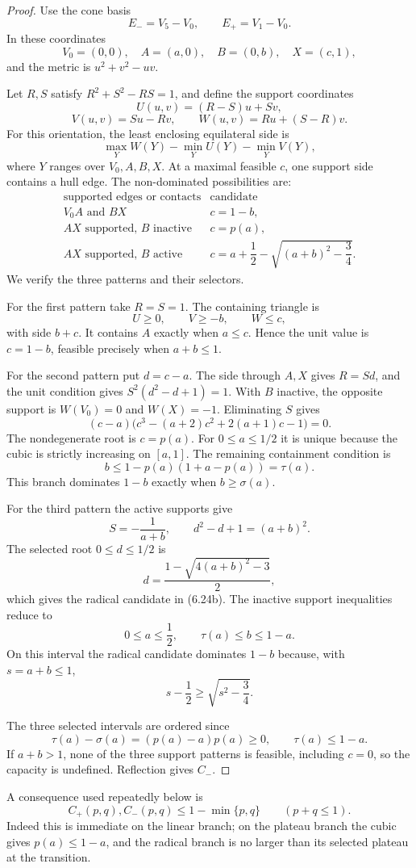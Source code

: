 \begin{proof}
Use the cone basis
\[
 E_-=V_5-V_0,
 \qquad E_+=V_1-V_0.
\]
In these coordinates
\[
 V_0=(0,0),\quad A=(a,0),\quad B=(0,b),\quad X=(c,1),
\]
and the metric is $u^2+v^2-uv$.

Let $R,S$ satisfy $R^2+S^2-RS=1$, and define the support coordinates
\[
 U(u,v)=(R-S)u+Sv,
\]
\[
 V(u,v)=Su-Rv,
 \qquad
 W(u,v)=Ru+(S-R)v.
\]
For this orientation, the least enclosing equilateral side is
\[
 \max_YW(Y)-\min_YU(Y)-\min_YV(Y),
 \tag{6.24c}
\]
where $Y$ ranges over $V_0,A,B,X$.  At a maximal feasible $c$, one support
side contains a hull edge.  The non-dominated possibilities are:
\[
\begin{array}{c|c}
\text{supported edges or contacts}&\text{candidate}\\
\hline
V_0A\text{ and }BX&c=1-b,\\
AX\text{ supported, }B\text{ inactive}&c=p(a),\\
AX\text{ supported, }B\text{ active}
 &c=a+\dfrac12-\sqrt{(a+b)^2-\dfrac34}.
\end{array}
\tag{6.24d}
\]
We verify the three patterns and their selectors.

For the first pattern take $R=S=1$.  The containing triangle is
\[
 U\ge0,
 \qquad V\ge-b,
 \qquad W\le c,
\]
with side $b+c$.  It contains $A$ exactly when $a\le c$.  Hence the unit
value is $c=1-b$, feasible precisely when $a+b\le1$.

For the second pattern put $d=c-a$.  The side through $A,X$ gives $R=Sd$,
and the unit condition gives $S^2(d^2-d+1)=1$.  With $B$ inactive, the
opposite support is $W(V_0)=0$ and $W(X)=-1$.  Eliminating $S$ gives
\[
(c-a)
\bigl(c^3-(a+2)c^2+2(a+1)c-1\bigr)=0.
\]
The nondegenerate root is $c=p(a)$.  For $0\le a\le1/2$ it is unique because
the cubic is strictly increasing on $[a,1]$.  The remaining containment
condition is
\[
 b\le1-p(a)(1+a-p(a))=\tau(a).
\]
This branch dominates $1-b$ exactly when $b\ge\sigma(a)$.

For the third pattern the active supports give
\[
 S=-\frac1{a+b},
 \qquad
 d^2-d+1=(a+b)^2.
\]
The selected root $0\le d\le1/2$ is
\[
 d=\frac{1-\sqrt{4(a+b)^2-3}}2,
\]
which gives the radical candidate in (6.24b).  The inactive support
inequalities reduce to
\[
0\le a\le\frac12,
\qquad
\tau(a)\le b\le1-a.
\]
On this interval the radical candidate dominates $1-b$ because, with
$s=a+b\le1$,
\[
 s-\frac12\ge\sqrt{s^2-\frac34}.
\]

The three selected intervals are ordered since
\[
 \tau(a)-\sigma(a)=(p(a)-a)p(a)\ge0,
 \qquad
 \tau(a)\le1-a.
\]
If $a+b>1$, none of the three support patterns is feasible, including
$c=0$, so the capacity is undefined.  Reflection gives $C_-$.
\end{proof}

A consequence used repeatedly below is
\[
 \boxed{C_+(p,q),C_-(p,q)\le1-\min\{p,q\}}
 \qquad(p+q\le1).
 \tag{6.24e}
\]
Indeed this is immediate on the linear branch; on the plateau branch the
cubic gives $p(a)\le1-a$, and the radical branch is no larger than its
selected plateau at the transition.

